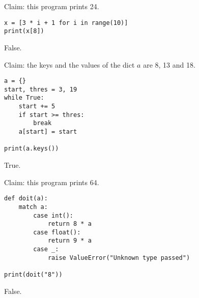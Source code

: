 \documentclass[stochastic-or.tex]{subfiles}
\begin{document}
\begin{truefalse}
Claim: this program prints 24.
\begin{verbatim}
x = [3 * i + 1 for i in range(10)]
print(x[8])
\end{verbatim}
    \begin{solution}
        False.
    \end{solution}
\end{truefalse}

\begin{truefalse}
Claim: the keys and the values of the dict $a$ are 8, 13 and 18.
\begin{verbatim}
a = {}
start, thres = 3, 19
while True:
    start += 5
    if start >= thres:
        break
    a[start] = start

print(a.keys())
\end{verbatim}
    \begin{solution}
        True.
    \end{solution}
\end{truefalse}


\begin{truefalse}
Claim: this program prints 64.
\begin{verbatim}
def doit(a):
    match a:
        case int():
            return 8 * a
        case float():
            return 9 * a
        case _:
            raise ValueError("Unknown type passed")

print(doit("8"))
\end{verbatim}
    \begin{solution}
        False.
    \end{solution}
\end{truefalse}
\end{document}
